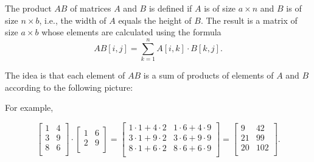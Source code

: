 
The product $AB$ of matrices $A$ and $B$
is defined if $A$ is of size $a \times n$
and $B$ is of size $n \times b$, i.e.,
the width of $A$ equals the height of $B$.
The result is a matrix of size $a \times b$
whose elements are calculated using the formula
\[
    AB[i,j] = \sum_{k=1}^n A[i,k] \cdot B[k,j].
\]

The idea is that each element of $AB$
is a sum of products of elements of $A$ and $B$
according to the following picture:

\begin{center}
\end{center}

For example,

\[
    \begin{bmatrix}
        1 & 4 \\
        3 & 9 \\
        8 & 6 \\
    \end{bmatrix}
    \cdot
    \begin{bmatrix}
        1 & 6 \\
        2 & 9 \\
    \end{bmatrix}
    =
    \begin{bmatrix}
        1 \cdot 1 + 4 \cdot 2 & 1 \cdot 6 + 4 \cdot 9 \\
        3 \cdot 1 + 9 \cdot 2 & 3 \cdot 6 + 9 \cdot 9 \\
        8 \cdot 1 + 6 \cdot 2 & 8 \cdot 6 + 6 \cdot 9 \\
    \end{bmatrix}
    =
    \begin{bmatrix}
        9  & 42  \\
        21 & 99  \\
        20 & 102 \\
    \end{bmatrix}.
\]

